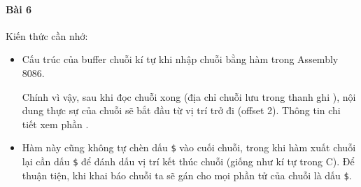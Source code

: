 \documentclass[main.tex]{subfiles}
\begin{document}
\inputminted[linenos,breaklines]{nasm}{answer_source/Bai5.asm}
\paragraph*{Bài 6}
Kiến thức cần nhớ:
\begin{itemize}
    \item Cấu trúc của buffer chuỗi kí tự khi nhập chuỗi bằng hàm  trong Assembly 8086.
    \begin{figure}[H]
        \centering
    \end{figure}
        Chính vì vậy, sau khi đọc chuỗi xong (địa chỉ chuỗi lưu trong thanh ghi ), nội dung thực sự của chuỗi sẽ bắt đầu từ vị trí \cd{[dx + 2]} trở đi (offset 2). Thông tin chi tiết xem phần .
    \item Hàm này cũng không tự chèn dấu \verb#$# vào cuối chuỗi, trong khi hàm xuất chuỗi lại cần dấu \verb#$# để đánh dấu vị trí kết thúc chuỗi (giống như kí tự  trong C). Để thuận tiện, khi khai báo chuỗi ta sẽ gán cho mọi phần tử của chuỗi là dấu \verb#$#.
\end{itemize}

\inputminted[linenos,breaklines]{nasm}{answer_source/Bai6.asm}

\end{document}
